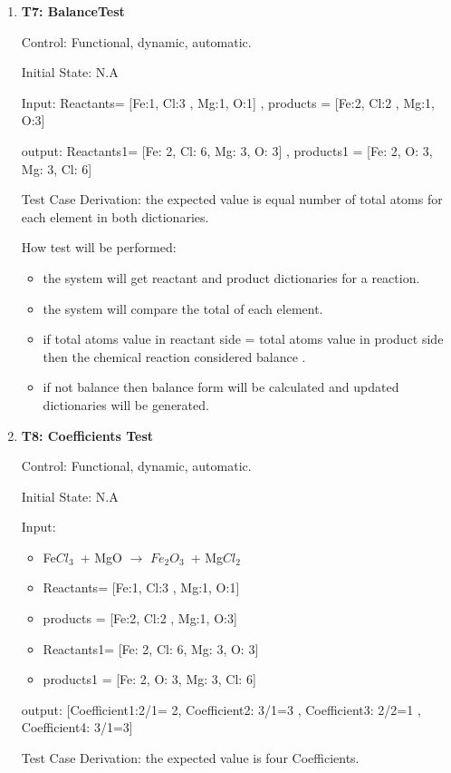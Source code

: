 \documentclass[12pt, titlepage]{article}
\begin{document}
\begin{enumerate}
\item{\bf T7: BalanceTest\\}

Control: Functional, dynamic, automatic.
					
Initial State: N.A
					
Input: Reactants= [Fe:1, Cl:3 , Mg:1, O:1] , products = [Fe:2, Cl:2 , Mg:1, O:3]

output: Reactants1=  [Fe: 2, Cl: 6, Mg: 3, O: 3]  , products1 = [Fe: 2, O: 3, Mg: 3, Cl: 6]

Test Case Derivation: the expected value is equal number of total atoms for each element in both dictionaries.

How test will be performed: 
\begin{itemize}
\item the system will get reactant  and product dictionaries for a reaction. 
\item the system will compare the total of each element.
\item if total atoms value in reactant side = total atoms value in product side then the chemical reaction considered balance . 
\item if not balance then balance form will be calculated and updated dictionaries will be generated.
\end{itemize}

\item{\bf T8: Coefficients Test\\}

Control: Functional, dynamic, automatic.
					
Initial State: N.A
					
Input: 
\begin{itemize}
\item Fe$Cl_3$ + MgO $\rightarrow$ $Fe_2$$O_3$ + Mg$Cl_2$ 
\item Reactants= [Fe:1, Cl:3 , Mg:1, O:1] 
\item products = [Fe:2, Cl:2 , Mg:1, O:3] 
\item Reactants1=  [Fe: 2, Cl: 6, Mg: 3, O: 3] 
\item products1 = [Fe: 2, O: 3, Mg: 3, Cl: 6] 
\end{itemize}
output: [Coefficient1:2/1= 2, Coefficient2: 3/1=3 , Coefficient3: 2/2=1 , Coefficient4: 3/1=3]

Test Case Derivation: the expected value is four Coefficients.


\end{enumerate}
\end{document}
